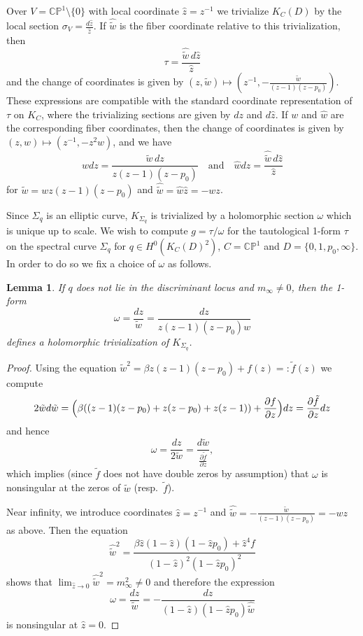 \documentclass[12pt,letterpaper,reqno]{amsart}
\newtheorem{lem}[thm]{Lemma}
\theoremstyle{remark}
\theoremstyle{definition}
\numberwithin{thm}{section}
\numberwithin{equation}{section}
\numberwithin{figure}{section}
\newcommand{\CP}{\ensuremath{\mathbb {CP}}}
\begin{document}
Over $V = \CP^1 \setminus \{0\}$ with local coordinate $\hat z = z^{-1}$ we trivialize $K_C(D)$ by the local section $\sigma_V = \frac{d \hat z}{\hat z}$. If $\hat{\tilde w}$ is the fiber coordinate relative to this trivialization, then
 \[
\tau = \frac{\hat{\tilde{w}} \, d \hat z}{\hat z}
\]
and the change of coordinates is given by $(z, \tilde w) \mapsto  (z^{-1}, - \frac{\tilde w}{(z-1)(z-p_0)})$. These expressions are compatible with the standard coordinate representation of $\tau$ on $K_C$, where the trivializing sections are given by $dz$ and $d \hat{z}$. If $w$ and $\hat{w}$ are the corresponding fiber coordinates, then the change of coordinates is given by $(z,w) \mapsto (z^{-1}, -z^2w)$, and  we have
\[
 w dz = \frac{\tilde{w} \, dz}{z(z-1)(z-p_0)} \quad \text{and} \quad \hat{w} d \hat z =  \frac{\hat{\tilde{w}} \, d \hat z}{\hat z}
\]
for $\tilde w = w z(z-1)(z-p_0)$ and $\hat{\tilde{w}} = \hat{w}\hat{z} = - wz$.
 

\medskip

Since $\Sigma_q$ is an elliptic curve, $K_{\Sigma_q}$ is  trivialized by a holomorphic section $\omega$ which is unique up to scale. We wish to compute $g = \tau / \omega$ for the tautological 1-form $\tau$ on the spectral curve $\Sigma_q$ for $q \in H^0(K_C(D)^2)$, $C= \CP^1$ and $D= \{0,1, p_0, \infty\}$. In order to do so we fix a choice of $\omega$ as follows.

\begin{lem}\label{invariant_1-form}
If $q$ does not lie in the discriminant locus and $m_\infty \neq0$, then the 1-form 	
\[
\omega =  \frac{dz}{ \tilde w} = \frac{dz}{ z (z-1)(z-p_0)w}
\]
defines a holomorphic trivialization of $K_{\Sigma_q}$.
\end{lem}

\begin{proof}
Using the equation $\tilde w^2 = \beta z( z-1)(z-p_0) + f(z) =: \tilde f(z)$ we compute
\[
2 \tilde w d \tilde w = \Bigl( \beta ((z-1)(z-p_0)  +z (z-p_0) + z (z-1)) + \frac{\partial f}{\partial z} \Bigr) dz = \frac{\partial \tilde f}{\partial z}dz
\]
and hence
\[
\omega = \frac{dz}{2 \tilde w} = \frac{ d \tilde w}{\frac{\partial \tilde f}{\partial z}},
\] 
which implies (since $\tilde f$ does not have double zeros by assumption) that $\omega$ is nonsingular at the zeros of $\tilde w$ (resp.\ $\tilde f$).


Near infinity, we introduce coordinates $\hat z = z^{-1}$ and $\hat{\tilde w} = - \frac{\tilde w}{(z-1)(z-p_0)} = - wz$ as above. Then the equation
\[
\hat{\tilde{w}}^2 = \frac{\beta \hat z (1 - \hat z)(1 - \hat z p_0) + \hat z^4 f}{(1-\hat z)^2(1 - \hat z p_0)^2}
\]
shows that $\lim_{\hat z \to 0} \hat{\tilde w}^2 = m_\infty^2 \neq 0$ and therefore the expression
\[
\omega = \frac{dz}{\tilde w} = - \frac{d \hat z}{  (1- \hat z)(1 - \hat z p_0) \hat{\tilde w}}
\]
is nonsingular at $\hat z =0$.
\end{proof}
\end{document}
